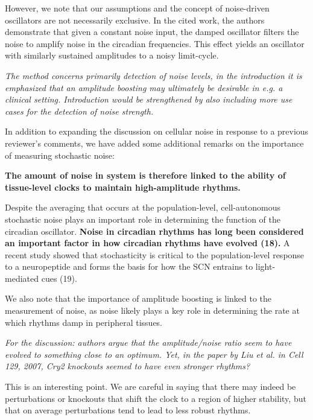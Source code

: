 \documentclass[11pt, letterpaper]{article}
\newenvironment{reviewer}{\itshape\color{gray}}{}
\newenvironment{manuscript}[1]{\begin{center}\begin{tcolorbox}[colback=green!5!white,colframe=green!75!black,width=\textwidth,title={#1},breakable,fonttitle=\bfseries]}{\end{tcolorbox}\end{center}}
\begin{document}
However, we note that our assumptions and the concept of noise-driven oscillators are not necessarily exclusive. In the cited work, the authors demonstrate that given a constant noise input, the damped oscillator filters the noise to amplify noise in the circadian frequencies. This effect yields an oscillator with similarly sustained amplitudes to a noisy limit-cycle.

\begin{reviewer}
The method concerns primarily detection of noise levels, in the introduction it is emphasized that an amplitude boosting may ultimately be desirable in e.g. a clinical setting. Introduction would be strengthened by also including more use cases for the detection of noise strength.
\end{reviewer}

In addition to expanding the discussion on cellular noise in response to a previous reviewer's comments, we have added some additional remarks on the importance of measuring stochastic noise:

\begin{manuscript}{Page 3}
  {\bfseries
  The amount of noise in system is therefore linked to the ability of tissue-level clocks to maintain high-amplitude rhythms. }

Despite the averaging that occurs at the population-level, cell-autonomous stochastic noise plays an important role in determining the function of the circadian oscillator. {\bfseries Noise in circadian rhythms has long been considered an important factor in how circadian rhythms have evolved (18).} A recent study showed that stochasticity is critical to the population-level response to a neuropeptide and forms the basis for how the SCN entrains to light-mediated cues (19).
\end{manuscript}

We also note that the importance of amplitude boosting is linked to the measurement of noise, as noise likely plays a key role in determining the rate at which rhythms damp in peripheral tissues.

\begin{reviewer}
For the discussion: authors argue that the amplitude/noise ratio seem to have evolved to something close to an optimum. Yet, in the paper by Liu et al. in Cell 129, 2007, Cry2 knockouts seemed to have even stronger rhythms?
\end{reviewer}

This is an interesting point. We are careful in saying that there may indeed be perturbations or knockouts that shift the clock to a region of higher stability, but that on average perturbations tend to lead to less robust rhythms.
\end{document}
